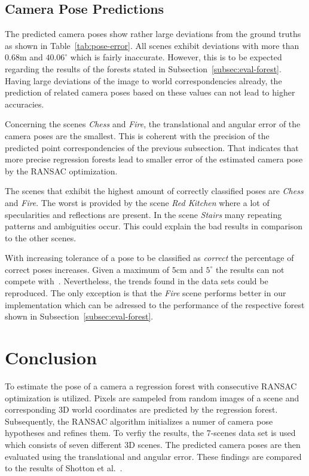 \documentclass[final]{cvpr}
\begin{document}
\subsection{Camera Pose Predictions}
The predicted camera poses show rather large deviations from the ground truths as shown in Table~\ref{tab:pose-error}.
All scenes exhibit deviations with more than $0.68$m and $40.06^\circ$ which is fairly inaccurate. However, this is
to be expected regarding the results of the forests stated in Subsection~\ref{subsec:eval-forest}. Having large deviations 
of the image to world correspondencies already, the prediction of related camera poses based on these values can not lead
to higher accuracies. 

Concerning the scenes \textit{Chess} and \textit{Fire}, the translational and angular error of the camera poses 
are the smallest. 
This is coherent with the precision of the predicted point correspondencies of the previous subsection. 
That indicates that more precise regression forests lead to smaller error of the estimated camera pose 
by the RANSAC optimization. 

The scenes that exhibit the highest amount of correctly classified poses are \textit{Chess} and \textit{Fire}. 
The worst is provided by the scene \textit{Red Kitchen} where a lot of specularities and reflections are 
present. In the scene \textit{Stairs} many repeating patterns and ambiguities occur. This could explain the bad results 
in comparison to the other scenes.

With increasing tolerance of a pose to be classified as \textit{correct} the percentage of correct poses increases. 
Given a maximum of $5$cm and $5^\circ$ the results can not compete with~\cite{shotton2013}. Nevertheless, the trends found in 
the data sets could be reproduced. The only exception is that the \textit{Fire} scene performs better in our implementation 
which can be adressed to the performance of the respective forest shown in Subsection~\ref{subsec:eval-forest}.


\section{Conclusion}
To estimate the pose of a camera a regression forest with consecutive RANSAC optimization is utilized. Pixels are sampeled from
random images of a scene and corresponding 3D world coordinates are predicted by the regression forest. Subsequently, 
the RANSAC algorithm initializes a numer of camera pose hypotheses and refines them. To verfiy the results, the 7-scenes data 
set is used which consists of seven different 3D scenes. The predicted camera poses are then evaluated
using the translational and angular error. These findings are compared to the results of Shotton et 
al.~\cite{shotton2013}. 
\end{document}
